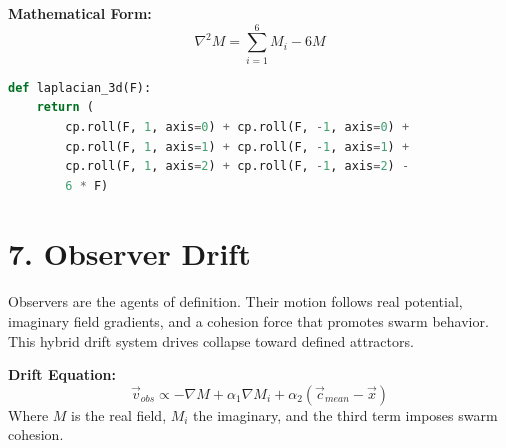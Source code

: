 \textbf{Mathematical Form:}
\[
\nabla^2 M = \sum_{i=1}^{6} M_i - 6M
\]

\begin{lstlisting}[language=Python]
def laplacian_3d(F):
    return (
        cp.roll(F, 1, axis=0) + cp.roll(F, -1, axis=0) +
        cp.roll(F, 1, axis=1) + cp.roll(F, -1, axis=1) +
        cp.roll(F, 1, axis=2) + cp.roll(F, -1, axis=2) -
        6 * F)
\end{lstlisting}

\section*{7. Observer Drift}
Observers are the agents of definition. Their motion follows real potential, imaginary field gradients, and a cohesion force that promotes swarm behavior. This hybrid drift system drives collapse toward defined attractors.

\textbf{Drift Equation:}
\[
\vec{v}_{obs} \propto -\nabla M + \alpha_1 \nabla M_i + \alpha_2 (\vec{c}_{mean} - \vec{x})
\]
Where \( M \) is the real field, \( M_i \) the imaginary, and the third term imposes swarm cohesion.

